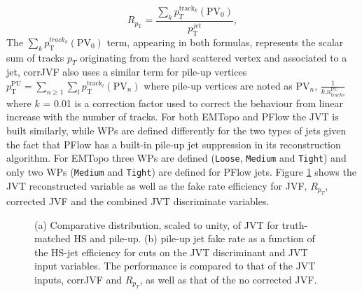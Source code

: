 \begin{equation}
    R_{p_{\mathrm{T}}}=\frac{\sum_{k} p_{T}^{\mathrm{track}_{k}}\left(\mathrm{PV}_{0}\right)}{p_{\mathrm{T}}^{j e t}},
\end{equation}
The  $\sum_{k} p_{\mathrm{T}}^{{track}_{k}}\left(\mathrm{PV}_{0}\right)$ term, appearing in both formulas, represents the scalar sum of tracks $p_T$ originating from the hard scattered vertex and associated to a jet, corrJVF also uses a similar term for pile-up vertices $p_{\mathrm{T}}^{\mathrm{PU}}=\sum_{n \geq 1} \sum_{l} p_{\mathrm{T}}^{\mathrm{track}_{l}}\left(\mathrm{PV}_{n}\right)$  where pile-up vertices are noted as $\mathrm{PV}_{n}$, $\frac{1}{k . n_{tracks }^{\mathrm{PU}}}$ where $k$ = 0.01 is a correction factor used to correct the behaviour from linear increase with the number of tracks. For both EMTopo and PFlow the JVT is built similarly, while WPs are defined differently for the two types of jets given the fact that PFlow has a built-in pile-up jet suppression in its reconstruction algorithm. For EMTopo three WPs are defined (\texttt{Loose}, \texttt{Medium} and \texttt{Tight}) and only two WPs (\texttt{Medium} and \texttt{Tight}) are defined for PFlow jets. Figure \ref{fig:Jet:Tag:JVT} shows the JVT reconstructed variable as well as the fake rate efficiency for JVF, $R_{p_T}$, corrected JVF and the combined JVT discriminate variables.
\begin{figure}[htbp]
    \centering
    \caption{(a) Comparative distribution, scaled to unity, of JVT for truth-matched HS and pile-up. (b) pile-up jet fake rate as a function of the HS-jet efficiency for cuts on the JVT discriminant and JVT input variables. The performance is compared to that of the JVT inputs, corrJVF and $R_{p_T}$, as well as that of the no corrected JVF.}
    \label{fig:Jet:Tag:JVT}
\end{figure}

